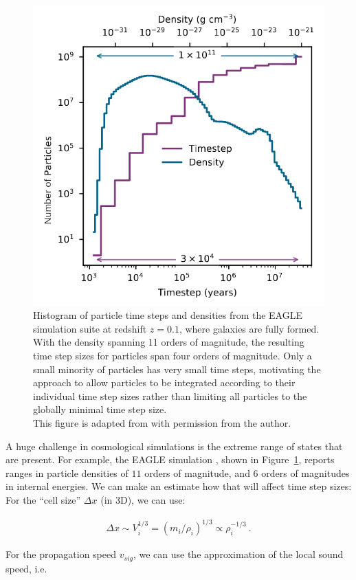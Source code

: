 \begin{figure}
 \centering
 \includegraphics[width=.5\textwidth]{figures/Meshless/EAGLE_timesteps.png}
 \caption{
Histogram of particle time steps and densities from the EAGLE simulation suite
\citep{schayeEAGLEProjectSimulating2015, schallerEAGLESimulationsGalaxy2015} at redshift $z = 0.1$,
where galaxies are fully formed.
With the density spanning 11 orders of magnitude, the resulting time step sizes for particles span
four orders of magnitude. Only a small minority of particles has very small time steps, motivating
the approach to allow particles to be integrated according to their individual time step sizes
rather than limiting all particles to the globally minimal time step size. \\
%
This figure is adapted from \cite{borrowSWIFTMaintainingWeakscalability2018} with permission from
the author.
}
 \label{fig:eagle-timesteps}
\end{figure}





A huge challenge in cosmological simulations is the extreme range of states that are present. For
example, the EAGLE simulation \citep{schallerEAGLESimulationsGalaxy2015}, shown in
Figure~\ref{fig:eagle-timesteps}, reports ranges in particle densities of $11$ orders of magnitude,
and $6$ orders of magnitudes in internal energies. We can make an estimate how that will affect
time step sizes: For the ``cell size'' $\Delta x$ (in 3D), we can use:

\begin{align}
\Delta x \sim V_i^{1/3} = (m_i/\rho_i)^{1/3} \propto \rho_i^{-1/3} \ .
\end{align}

For the propagation speed $v_{sig}$, we can use the approximation of the local sound speed, i.e.

